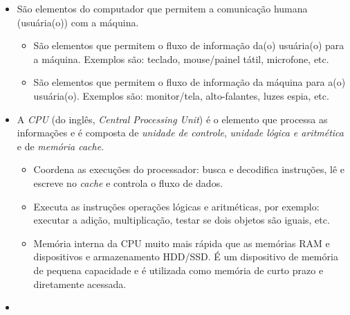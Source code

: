 \begin{itemize}
\item {}

  São elementos do computador que permitem a comunicação humana (usuária(o)) com a máquina.

  \begin{itemize}
  \item {}

    São elementos que permitem o fluxo de informação da(o) usuária(o) para a máquina. Exemplos são: teclado, mouse/painel tátil, microfone, etc.

  \item {}

    São elementos que permitem o fluxo de informação da máquina para a(o) usuária(o). Exemplos são: monitor/tela, alto-falantes, luzes espia, etc.
  \end{itemize}

\item {}

  A \emph{CPU} (do inglês, \textit{Central Processing Unit}) é o elemento que processa as informações e é composta de \emph{unidade de controle}, \emph{unidade lógica e aritmética} e de \emph{memória cache}.

  \begin{itemize}
  \item {}

    Coordena as execuções do processador: busca e decodifica instruções, lê e escreve no \textit{cache} e controla o fluxo de dados.

  \item {}

    Executa as instruções operações lógicas e aritméticas, por exemplo: executar a adição, multiplicação, testar se dois objetos são iguais, etc.

  \item {}

    Memória interna da CPU muito mais rápida que as memórias RAM e dispositivos e armazenamento HDD/SSD. É um dispositivo de memória de pequena capacidade e é utilizada como memória de curto prazo e diretamente acessada.
  \end{itemize}

\item {}


\end{itemize}
